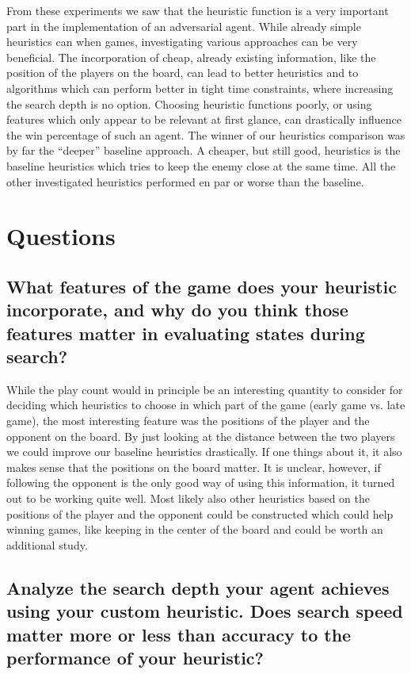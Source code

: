 \documentclass[aps,prd,notitlepage,floatfix,superscriptaddress,groupedaddress,nofootinbib]{revtex4-1}
\begin{document}
From these experiments we saw that the heuristic function is a very important part in the implementation of an adversarial agent. While already simple heuristics can when games, investigating various approaches can be very beneficial. The incorporation of cheap, already existing information, like the position of the players on the board, can lead to better heuristics and to algorithms which can perform better in tight time constraints, where increasing the search depth is no option. Choosing heuristic functions poorly, or using features which only appear to be relevant at first glance, can drastically influence the win percentage of such an agent. The winner of our heuristics comparison was by far the ``deeper'' baseline approach. A cheaper, but still good, heuristics is the baseline heuristics which tries to keep the enemy close at the same time. All the other investigated heuristics performed en par or worse than the baseline.

\section{Questions}

\subsection{What features of the game does your heuristic incorporate, and why do you think those features matter in evaluating states during search?}

While the play count would in principle be an interesting quantity to consider for deciding which heuristics to choose in which part of the game (early game vs. late game), the most interesting feature was the positions of the player and the opponent on the board. By just looking at the distance between the two players we could improve our baseline heuristics drastically. If one things about it, it also makes sense that the positions on the board matter. It is unclear, however, if following the opponent is the only good way of using this information, it turned out to be working quite well. Most likely also other heuristics based on the positions of the player and the opponent could be constructed which could help winning games, like keeping in the center of the board and could be worth an additional study.

\subsection{Analyze the search depth your agent achieves using your custom heuristic. Does search speed matter more or less than accuracy to the performance of your heuristic?}
\end{document}
